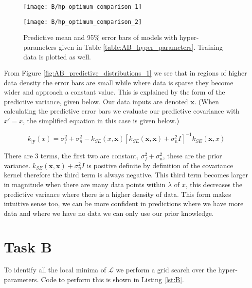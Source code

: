 \documentclass[11pt]{article}
\newcommand{\Lik}{\mathcal{L}}
\begin{document}
\begin{figure}[h]
    \centering
    \begin{minipage}{0.5\textwidth}
        \centering
        \texttt{[image: B/hp\_optimum\_comparison\_1]} 
        \label{fig:AB_predictive_distributions_1}
    \end{minipage}%
    \begin{minipage}{0.5\textwidth}
        \centering
        \texttt{[image: B/hp\_optimum\_comparison\_2]} 
        \label{fig:AB_predictive_distributions_2}
    \end{minipage}
    \caption{Predictive mean and 95\% error bars of models with hyper-parameters given in Table \ref{table:AB_hyper_parameters}. Training data is plotted as well.}
    \label{fig:AB_predictive_distributions}
\end{figure}

From Figure \ref{fig:AB_predictive_distributions_1} we see that in regions of higher data density the error bars are small while where data is sparse they become wider and approach a constant value. This is explained by the form of the predictive variance, given below. Our data inputs are denoted $\textbf{x}$. (When calculating the predictive error bars we evaluate our predictive covariance with $x' = x$, the simplified equation in this case is given below.)

\[k_{|\textbf{y}}(x) = \sigma_f^2 + \sigma_n^2 - k_{SE}(x, \textbf{x})[k_{SE}(\textbf{x}, \textbf{x}) + \sigma_n^2 I]^{-1} k_{SE}(\textbf{x}, x)\]

There are 3 terms, the first two are constant, $\sigma_f^2 + \sigma_n^2$, these are the prior variance. $k_{SE}(\textbf{x}, \textbf{x}) + \sigma_n^2 I$ is positive definite by definition of the covariance kernel therefore the third term is always negative. This third term becomes larger in magnitude when there are many data points within $\lambda$ of $x$, this decreases the predictive variance where there is a higher density of data. This form makes intuitive sense too, we can be more confident in predictions where we have more data and where we have no data we can only use our prior knowledge.

\section{Task B}

To identify all the local minima of $\Lik$ we perform a grid search over the hyper-parameters. Code to perform this is shown in Listing \ref{lst:B}.
\end{document}
